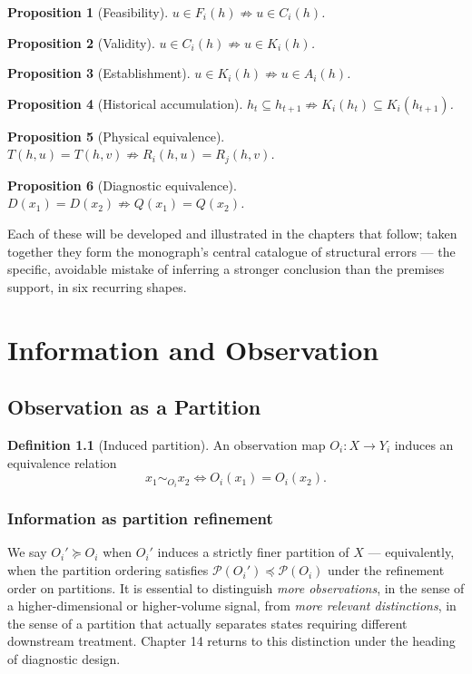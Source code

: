 \documentclass[11pt]{report}
\theoremstyle{definition}
\newtheorem{definition}{Definition}[chapter]
\theoremstyle{plain}
\newtheorem{proposition}[definition]{Proposition}
\begin{document}
\begin{proposition}[Feasibility]
$u \in F_i(h) \not\Rightarrow u \in C_i(h)$.
\end{proposition}
\begin{proposition}[Validity]
$u \in C_i(h) \not\Rightarrow u \in K_i(h)$.
\end{proposition}
\begin{proposition}[Establishment]
$u \in K_i(h) \not\Rightarrow u \in A_i(h)$.
\end{proposition}
\begin{proposition}[Historical accumulation]
$h_t \subseteq h_{t+1} \not\Rightarrow K_i(h_t) \subseteq K_i(h_{t+1})$.
\end{proposition}
\begin{proposition}[Physical equivalence]
$T(h,u) = T(h,v) \not\Rightarrow R_i(h,u) = R_j(h,v)$.
\end{proposition}
\begin{proposition}[Diagnostic equivalence]
$D(x_1) = D(x_2) \not\Rightarrow Q(x_1) = Q(x_2)$.
\end{proposition}

Each of these will be developed and illustrated in the chapters that follow; taken together they form the monograph's central catalogue of structural errors --- the specific, avoidable mistake of inferring a stronger conclusion than the premises support, in six recurring shapes.

\part{Information and Observation}

\chapter{Observation as a Partition}

\begin{definition}[Induced partition]
An observation map $O_i: X \to Y_i$ induces an equivalence relation
\[
x_1 \sim_{O_i} x_2 \iff O_i(x_1) = O_i(x_2).
\]
\end{definition}

\section{Information as partition refinement}
We say $O_i' \succeq O_i$ when $O_i'$ induces a strictly finer partition of $X$ --- equivalently, when the partition ordering satisfies $\mathcal{P}(O_i') \preceq \mathcal{P}(O_i)$ under the refinement order on partitions. It is essential to distinguish \emph{more observations}, in the sense of a higher-dimensional or higher-volume signal, from \emph{more relevant distinctions}, in the sense of a partition that actually separates states requiring different downstream treatment. Chapter 14 returns to this distinction under the heading of diagnostic design.
\end{document}
